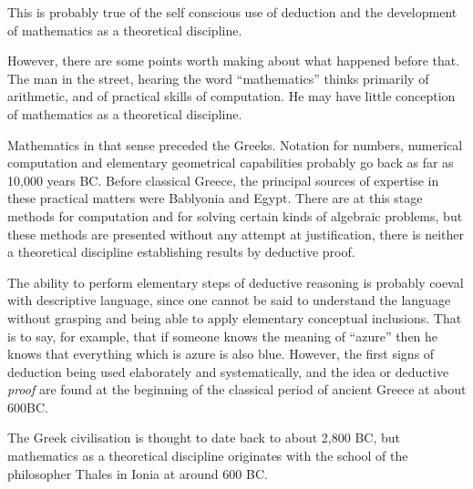 This is probably true of the self conscious use of deduction and the
development of mathematics as a theoretical discipline.

However, there are some points worth making about what happened before
that.
The man in the street, hearing the word ``mathematics'' thinks
primarily of arithmetic, and of practical skills of computation.
He may have little conception of mathematics as a theoretical
discipline.

Mathematics in that sense preceded the Greeks.
Notation for numbers, numerical computation and elementary
geometrical capabilities probably go back as far as 10,000
years BC.
Before classical Greece, the principal sources of expertise in these
practical matters were Bablyonia and Egypt.
There are at this stage methods for computation and for solving
certain kinds of algebraic problems, but these methods are presented
without any attempt at justification, there is neither a theoretical
discipline establishing results by deductive proof.

The ability to perform elementary steps of deductive reasoning is
probably coeval with descriptive language, since one cannot be said to
understand the language without grasping and being able to apply
elementary conceptual inclusions.
That is to say, for example, that if someone knows the meaning of
``azure'' then he knows that everything which is azure is also blue.
However, the first signs of deduction being used elaborately and
systematically, and the idea or deductive \emph{proof} are found at
the beginning of the classical period of ancient Greece at about 600BC.




The Greek civilisation is thought to date back to about 2,800 BC, but
mathematics as a theoretical discipline originates with the school of
the philosopher Thales in Ionia at around 600 BC.

